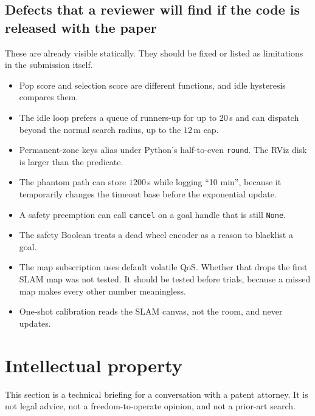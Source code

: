 \documentclass[11pt]{article}
\begin{document}
\subsection{Defects that a reviewer will find if the code is released with the paper}
These are already visible statically. They should be fixed or listed as limitations in the submission itself.
\begin{itemize}
\item Pop score and selection score are different functions, and idle hysteresis compares them.
\item The idle loop prefers a queue of runners-up for up to $20$\,s and can dispatch beyond the normal search radius, up to the $12$\,m cap.
\item Permanent-zone keys alias under Python's half-to-even \texttt{round}. The RViz disk is larger than the predicate.
\item The phantom path can store $1200$\,s while logging ``10 min'', because it temporarily changes the timeout base before the exponential update.
\item A safety preemption can call \texttt{cancel} on a goal handle that is still \texttt{None}.
\item The safety Boolean treats a dead wheel encoder as a reason to blacklist a goal.
\item The map subscription uses default volatile QoS. Whether that drops the first SLAM map was not tested. It should be tested before trials, because a missed map makes every other number meaningless.
\item One-shot calibration reads the SLAM canvas, not the room, and never updates.
\end{itemize}

\section{Intellectual property}
This section is a technical briefing for a conversation with a patent attorney. It is not legal advice, not a freedom-to-operate opinion, and not a prior-art search.
\end{document}
